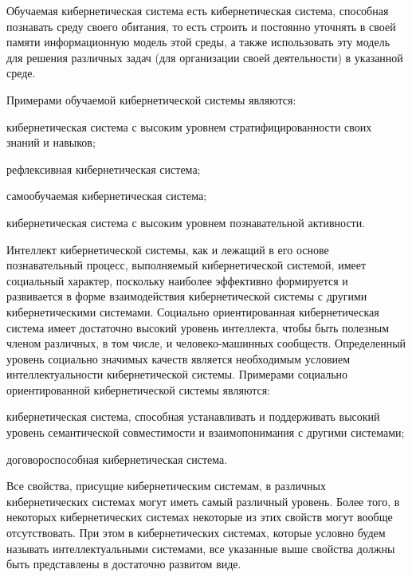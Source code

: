 Обучаемая кибернетическая система есть кибернетическая система, способная познавать среду своего обитания, то есть строить и постоянно уточнять в своей памяти информационную модель этой среды, а также использовать эту модель для решения различных задач (для организации своей деятельности) в указанной среде. 

Примерами обучаемой кибернетической системы являются:
\begin{textitemize}
    \item кибернетическая система с высоким уровнем стратифицированности своих знаний и навыков;
    \item рефлексивная кибернетическая система;
    \item самообучаемая кибернетическая система;
    \item кибернетическая система с высоким уровнем познавательной активности.
\end{textitemize}

Интеллект кибернетической системы, как и лежащий в его основе познавательный процесс, выполняемый кибернетической системой, имеет социальный характер, поскольку наиболее эффективно формируется и развивается в форме взаимодействия кибернетической системы с другими кибернетическими системами.
Социально ориентированная кибернетическая система имеет достаточно высокий уровень интеллекта, чтобы быть полезным членом различных, в том числе, и человеко-машинных сообществ.
Определенный уровень социально значимых качеств является необходимым условием интеллектуальности кибернетической системы.
Примерами социально ориентированной кибернетической системы являются:
\begin{textitemize}
    \item кибернетическая система, способная устанавливать и поддерживать высокий уровень семантической совместимости и взаимопонимания с другими системами;
    \item договороспособная кибернетическая система.
\end{textitemize}

Все свойства, присущие кибернетическим системам, в различных кибернетических системах могут иметь самый различный уровень.
Более того, в некоторых кибернетических системах некоторые из этих свойств могут вообще отсутствовать.
При этом в кибернетических системах, которые условно будем называть интеллектуальными системами, все указанные выше свойства должны быть представлены в достаточно развитом виде.